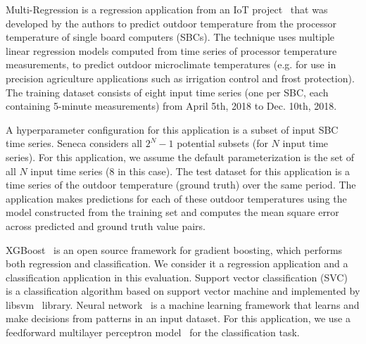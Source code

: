 Multi-Regression is a regression application 
from an IoT project~\cite{iot-cpu} that was developed by the authors
to predict outdoor temperature from the processor 
temperature of single board computers (SBCs).  
The technique uses multiple linear regression models computed from time
series of processor temperature measurements,
to predict outdoor microclimate temperatures (e.g. for use in 
precision agriculture applications such as irrigation control and frost protection).
The training dataset consists of eight input time series (one per SBC, each containing 
5-minute measurements) from April 5th, 2018 to Dec. 10th, 2018.

A hyperparameter configuration for this application is a subset of input SBC time series.
Seneca considers all \texttt{$2^N - 1$} potential subsets (for $N$ input time series).
For this application,
we assume the default parameterization is the set of all $N$ input time series (8 in this case).
The test dataset for this application is a time series of the outdoor temperature (ground truth) 
over the same period.  The application makes predictions for each of these outdoor temperatures
using the model constructed from the training set
and computes the mean square error across predicted and ground truth value pairs.

XGBoost~\cite{ref:xgboost-web} is an open source framework for gradient boosting, which 
performs both regression and classification. We consider it a regression application and
a classification application in this evaluation.  
Support vector classification (SVC)~\cite{ref:svc} is a classification algorithm 
based on support vector machine and implemented by libsvm~\cite{ref:libsvm} library.
Neural network~\cite{ref:neural_network} is a machine learning framework that learns 
and make decisions from patterns in an input dataset. For this application, 
we use a feedforward multilayer perceptron model~\cite{ref:feedforward_nn} 
for the classification task.

